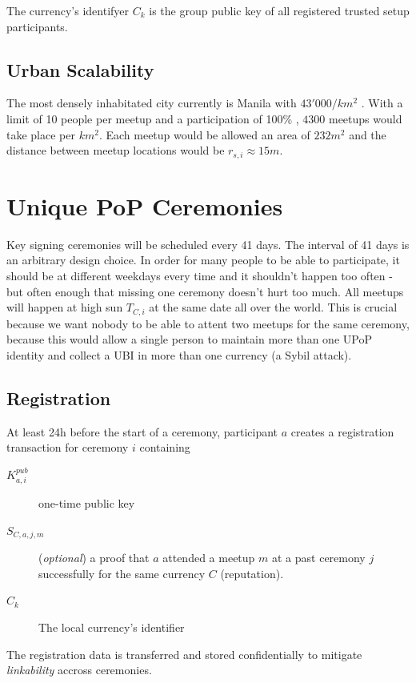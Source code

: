 \documentclass[conference]{IEEEtran}
\begin{document}
The currency's identifyer $C_k$ is the group public key of all registered trusted setup participants.

\subsection{Urban Scalability}
The most densely inhabitated city currently is Manila with $43'000/km^2$ \cite{manila18}. With a limit of 10 people per meetup and a participation of 100\% , $4300$ meetups would take place per $km^2$. Each meetup would be allowed an area of $232 m^2$ and the distance between meetup locations would be $r_{s,i} \approx 15m$. 

\section{Unique PoP Ceremonies}
Key signing ceremonies will be scheduled every 41 days. The interval of 41 days is an arbitrary design choice. In order for many people to be able to participate, it should be at different weekdays every time and it shouldn't happen too often - but often enough that missing one ceremony doesn't hurt too much. 
All meetups will happen at high sun $T_{C,i}$ at the same date all over the world. This is crucial because we want nobody to be able to attent two meetups for the same ceremony, because this would allow a single person to maintain more than one UPoP identity and collect a UBI in more than one currency (a Sybil attack).

\subsection{Registration}\label{ceremonyprep}
At least 24h before the start of a ceremony, participant $a$ creates a registration transaction for ceremony $i$ containing
\begin{description}
\item [$K_{a,i}^{pub}$] one-time public key
\item [$S_{C,a,j,m}$] (\emph{optional}) a proof that $a$ attended a meetup $m$ at a past ceremony $j$ successfully for the same currency $C$ (reputation).
\item [$C_k$] The local currency's identifier
\end{description}

The registration data is transferred and stored confidentially to mitigate \emph{linkability} accross ceremonies.
\end{document}
